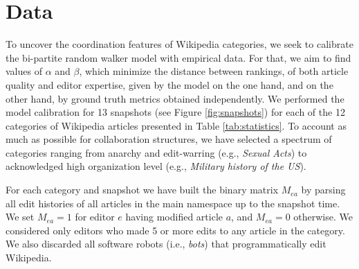 \clearpage
\section{Data}
To uncover the coordination features of Wikipedia categories, we seek to calibrate the bi-partite random walker model with empirical data. For that, we aim to find values of $\alpha$ and $\beta$, which minimize the distance between rankings, of both article quality and editor expertise, given by the model on the one hand, and on the other hand, by ground truth metrics obtained independently. We performed the model calibration for 13 snapshots (see Figure \ref{fig:snapshots})  for each of  the 12 categories of Wikipedia articles presented in Table \nolinebreak \ref{tab:statistics}. To account as much as possible for collaboration structures, we have selected a spectrum of categories ranging from anarchy and edit-warring (e.g., {\it Sexual Acts}) to acknowledged high organization level (e.g., {\it Military history of the US}).

For each category and snapshot we have built the binary matrix $M_{ea}$ by parsing all edit histories of all articles in the main namespace up to the snapshot time. We set $M_{ea} = 1$ for editor $e$ having modified article $a$, and $M_{ea} = 0$ otherwise. We considered only editors who made 5 or more edits to any article in the category. We also discarded all software robots (i.e., {\it bots}) that programmatically edit Wikipedia. 

